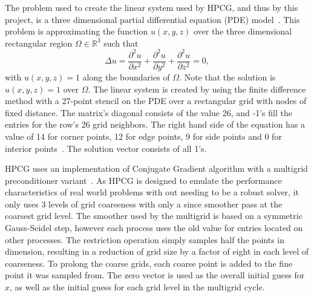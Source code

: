 The problem used to create the linear system used by HPCG, and thus by this project, is a three dimensional partial differential equation (PDE) model~\cite{Dongarra:2015:HPCG}.
This problem is approximating the function \(u(x, y, z)\) over the three dimensional rectangular region \(\Omega\in\mathbb{R}^3\) such that
\[
	\Delta u = \frac{\partial^2 u}{\partial x^2} + \frac{\partial^2 u}{\partial y^2} + \frac{\partial^2 u}{\partial z^2} = 0,
\] with \(u(x, y, z) = 1\) along the boundaries of \(\Omega\).
Note that the solution is \(u(x, y, z) = 1\) over \(\Omega\).
The linear system is created by using the finite difference method with a 27-point stencil on the PDE over a rectangular grid with nodes of fixed distance.
The matrix's diagonal consists of the value 26, and -1's fill the entries for the row's 26 grid neighbors.
The right hand side of the equation has a value of 14 for corner points, 12 for edge points, 9 for side points and 0 for interior points~\cite{Kincaid:2009:Numerical}.
The solution vector consists of all 1's.


HPCG uses an implementation of Conjugate Gradient algorithm with a multigrid preconditioner variant~\cite{Dongarra:2015:HPCG}.
As HPCG is designed to emulate the performance characteristics of real world problems with out needing to be a robust solver, it only uses 3 levels of grid coarseness with only a since smoother pass at the coarsest grid level.
The smoother used by the multigrid is based on a symmetric Gauss-Seidel step, however each process uses the old value for entries located on other processes.
The restriction operation simply samples half the points in dimension, resulting in a reduction of grid size by a factor of eight in each level of coarseness.
To prolong the coarse grids, each coarse point is added to the fine point it was sampled from.
The zero vector is used as the overall initial guess for \(x\), as well as the initial guess for each grid level in the multigrid cycle.

